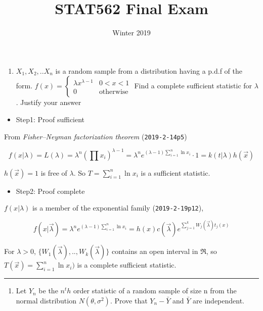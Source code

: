 \documentclass[12pt,]{article}
\title{STAT562 Final Exam}
\author{}
\date{Winter 2019}
\providecommand{\tightlist}{%
  \setlength{\itemsep}{0pt}\setlength{\parskip}{0pt}}
\begin{document}
\maketitle

\begin{enumerate}
\def\labelenumi{\arabic{enumi}.}
\tightlist
\item
  \textcolor[rgb]{0.5,0.5,0.5}{$X_1,X_2,..X_n$ is a random sample from a distribution having a p.d.f of the form.
  $f(x)=\begin{cases}\lambda x^{\lambda-1}&0<x<1\\0&\text{otherwise}\end{cases}$
  Find a complete sufficient statistic for $\lambda$. Justify your answer}
\end{enumerate}

\begin{itemize}
\tightlist
\item
  Step1: Proof sufficient
\end{itemize}

From \emph{Fisher--Neyman factorization theorem} (\texttt{2019-2-14p5})

\[f(x|\lambda)=L(\lambda)=\lambda^n(\prod x_i)^{\lambda-1}=\lambda^ne^{(\lambda-1)\sum^n_{i=1} \ln x_i}\cdot1=k(t|\lambda)h(\vec x)\]

\(h(\vec x)=1\) is free of \(\lambda\). So \(T=\sum^n_{i=1} \ln x_i\) is
a sufficient statistic.

\begin{itemize}
\tightlist
\item
  Step2: Proof complete
\end{itemize}

\(f(x|\lambda)\) is a member of the exponential family
(\texttt{2019-2-19p12}),

\[f(x|\vec\lambda)=\lambda^ne^{(\lambda-1)\sum^n_{i=1} \ln x_i}=h(x)c(\vec \lambda)e^{\sum^k_{j=1}W_j(\vec \lambda)t_j(x)}\]

For \(\lambda>0\), \(\{W_1(\vec \lambda),..,W_k(\vec \lambda)\}\)
contains an open interval in \(\Re\), so
\(T(\vec x)=\sum^n_{i=1} \ln x_i)\) is a complete sufficient statistic.

\begin{center}\rule{0.5\linewidth}{\linethickness}\end{center}

\begin{enumerate}
\def\labelenumi{\arabic{enumi}.}
\setcounter{enumi}{1}
\tightlist
\item
  \textcolor[rgb]{0.5,0.5,0.5}{Let $Y_n$ be the $n^th$ order statistic of a random sample of size n from the normal distribution $N(\theta,\sigma^2)$. Prove that $Y_n-\bar Y$ and $\bar Y$ are independent.}
\end{enumerate}
\end{document}
